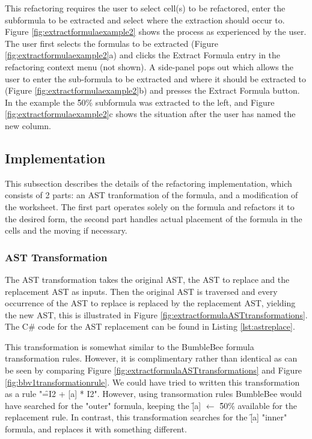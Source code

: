 This refactoring requires the user to select cell(s) to be refactored, enter the subformula to be extracted and select where the extraction should occur to.
Figure \ref{fig:extractformulaexample2} shows the process as experienced by the user.
The user first selects the formulas to be extracted (Figure \ref{fig:extractformulaexample2}a) and clicks the Extract Formula entry in the refactoring context menu (not shown).
A side-panel pops out which allows the user to enter the sub-formula to be extracted and where it should be extracted to (Figure \ref{fig:extractformulaexample2}b) and presses the Extract Formula button.
In the example the \f{50\%} subformula was extracted to the left, and Figure \ref{fig:extractformulaexample2}c shows the situation after the user has named the new column.

\subsection{Implementation}

This subsection describes the details of the refactoring implementation, which consists of 2 parts: an AST tranformation of the formula, and a modification of the worksheet.
The first part operates solely on the formula and refactors it to the desired form, the second part handles actual placement of the formula in the cells and the moving if necessary.

\subsubsection{AST Transformation}
\label{subsec:astreplacementtransformation}

The AST transformation takes the original AST, the AST to replace and the replacement AST as inputs.
Then the original AST is traversed and every occurrence of the AST to replace is replaced by the replacement AST, yielding the new AST, this is illustrated in Figure \ref{fig:extractformulaASTtransformations}.
The C\# code for the AST replacement can be found in Listing \ref{lst:astreplace}.

This transformation is somewhat similar to the BumbleBee formula transformation rules.
However, it is complimentary rather than identical as can be seen by comparing Figure \ref{fig:extractformulaASTtransformations} and Figure \ref{fig:bbv1transformationrule}.
We could have tried to written this transformation as a rule "\f{=I2 + [a] * I2}".
However, using transormation rules BumbleBee would have searched for the "outer" formula, keeping the \f{[a]} $\gets$ \f{50\%} available for the replacement rule.
In contrast, this transformation searches for the \f{[a]} "inner" formula, and replaces it with something different.


